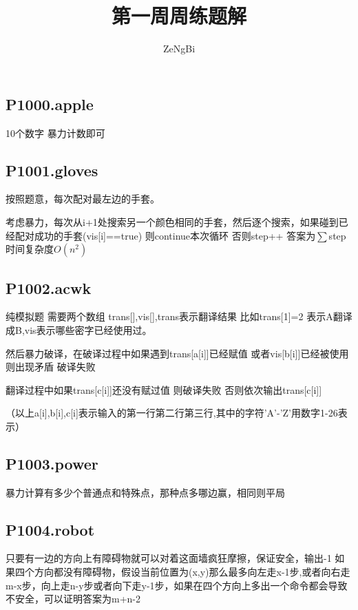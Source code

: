 \documentclass[UTF8]{ctexart}
\title{第一周周练题解}
\author{ZeNgBi}
\date{}
\begin{document}
	\maketitle
	\subsection*{P1000.apple}
	10个数字 暴力计数即可
	\subsection*{P1001.gloves}
	按照题意，每次配对最左边的手套。
	
	考虑暴力，每次从i+1处搜索另一个颜色相同的手套，然后逐个搜索，如果碰到已经配对成功的手套(vis[i]==true) 则continue本次循环 否则step++ 答案为$\sum$step 时间复杂度$O(n^2)$
	\subsection*{P1002.acwk}
	纯模拟题 需要两个数组 trans[],vis[],trans表示翻译结果 比如trans[1]=2 表示A翻译成B,vis表示哪些密字已经使用过。
	
	然后暴力破译，在破译过程中如果遇到trans[a[i]]已经赋值 或者vis[b[i]]已经被使用 则出现矛盾 破译失败
	
	翻译过程中如果trans[c[i]]还没有赋过值 则破译失败 否则依次输出trans[c[i]]
	
	（以上a[i],b[i],c[i]表示输入的第一行第二行第三行,其中的字符'A'-'Z'用数字1-26表示）
	\subsection*{P1003.power}
	暴力计算有多少个普通点和特殊点，那种点多哪边赢，相同则平局
	\subsection*{P1004.robot}
	只要有一边的方向上有障碍物就可以对着这面墙疯狂摩擦，保证安全，输出-1
	如果四个方向都没有障碍物，假设当前位置为(x,y)那么最多向左走x-1步,或者向右走m-x步，向上走n-y步或者向下走y-1步，如果在四个方向上多出一个命令都会导致不安全，可以证明答案为m+n-2
\end{document}
